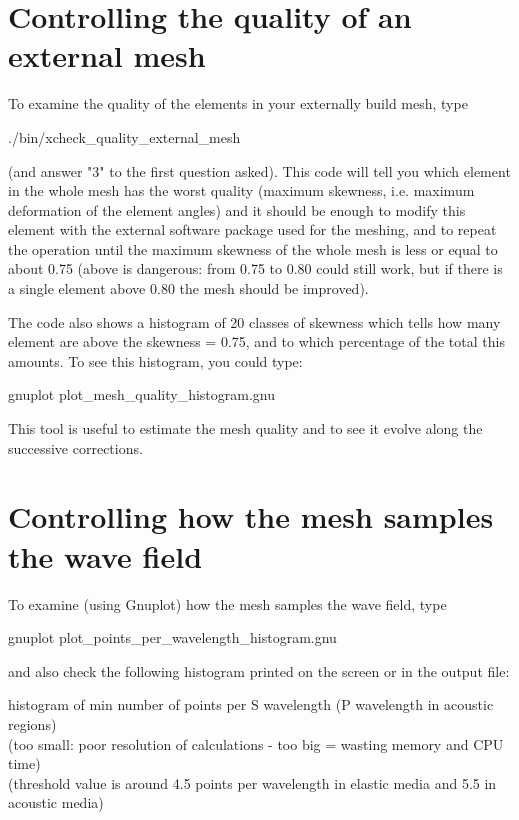 \documentclass[oneside,english,onecolumn,letterpaper]{book}
\newenvironment{lyxcode}
{\begin{list}{}{
\setlength{\rightmargin}{\leftmargin}
\setlength{\listparindent}{0pt}%
\raggedright
\setlength{\itemsep}{0pt}
\setlength{\parsep}{0pt}
\normalfont\ttfamily}%
 \item[]}
{\end{list}}
\begin{document}
\section{Controlling the quality of an external mesh}

To examine the quality of the elements in your externally build mesh, type
\begin{lyxcode}
./bin/xcheck\_quality\_external\_mesh
\end{lyxcode}
(and answer "3" to the first question asked).
This code will tell you which element in the whole mesh has the worst quality (maximum skewness, i.e. maximum deformation of the element angles) and it should be enough to modify this element with the external software package used for the meshing, and
to repeat the operation until the maximum skewness of the whole mesh is less or equal to about 0.75 (above is dangerous: from 0.75 to 0.80 could still work, but if there is a single element above 0.80 the mesh should be improved).

The code also shows a histogram of 20 classes of skewness which tells how many element are above the skewness = 0.75, and to which percentage of the total this amounts. To see this histogram, you could type:
\begin{lyxcode}
gnuplot plot\_mesh\_quality\_histogram.gnu
\end{lyxcode}
This tool is useful to estimate the mesh quality and to see it evolve along the successive corrections.

\section{Controlling how the mesh samples the wave field}

To examine (using Gnuplot) how the mesh samples the wave field, type
\begin{lyxcode}
gnuplot plot\_points\_per\_wavelength\_histogram.gnu
\end{lyxcode}
%
and also check the following histogram printed on the screen or in the output file:
%
\begin{lyxcode}
 histogram of min number of points per S wavelength
   (P wavelength in acoustic regions)\\
 (too small: poor resolution of calculations -
  too big = wasting memory and CPU time)\\
 (threshold value is around 4.5 points per wavelength
  in elastic media and 5.5 in acoustic media)
\end{lyxcode}
\end{document}
